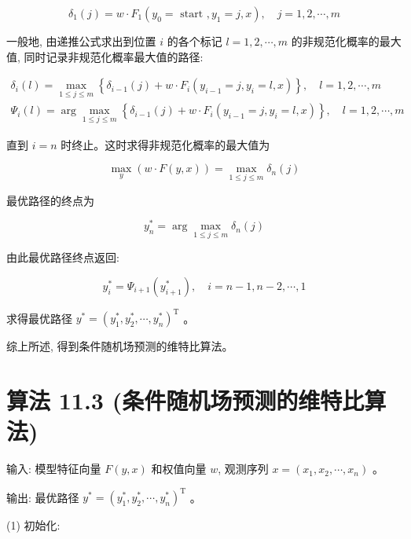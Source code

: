 \documentclass[10pt]{article}
\begin{document}
\begin{CJK*}{UTF8}{bsmi}
\begin{equation*}
\delta_{1}(j)=w \cdot F_{1}\left(y_{0}=\text { start }, y_{1}=j, x\right), \quad j=1,2, \cdots, m \tag{11.54}
\end{equation*}


一般地, 由递推公式求出到位置 $i$ 的各个标记 $l=1,2, \cdots, m$ 的非规范化概率的最大值, 同时记录非规范化概率最大值的路径:


\begin{gather*}
\delta_{i}(l)=\max _{1 \leqslant j \leqslant m}\left\{\delta_{i-1}(j)+w \cdot F_{i}\left(y_{i-1}=j, y_{i}=l, x\right)\right\}, \quad l=1,2, \cdots, m  \tag{11.55}\\
\Psi_{i}(l)=\arg \max _{1 \leqslant j \leqslant m}\left\{\delta_{i-1}(j)+w \cdot F_{i}\left(y_{i-1}=j, y_{i}=l, x\right)\right\}, \quad l=1,2, \cdots, m \tag{11.56}
\end{gather*}


直到 $i=n$ 时终止。这时求得非规范化概率的最大值为


\begin{equation*}
\max _{y}(w \cdot F(y, x))=\max _{1 \leqslant j \leqslant m} \delta_{n}(j) \tag{11.57}
\end{equation*}


最优路径的终点为


\begin{equation*}
y_{n}^{*}=\arg \max _{1 \leqslant j \leqslant m} \delta_{n}(j) \tag{11.58}
\end{equation*}


由此最优路径终点返回:


\begin{equation*}
y_{i}^{*}=\Psi_{i+1}\left(y_{i+1}^{*}\right), \quad i=n-1, n-2, \cdots, 1 \tag{11.59}
\end{equation*}


求得最优路径 $y^{*}=\left(y_{1}^{*}, y_{2}^{*}, \cdots, y_{n}^{*}\right)^{\mathrm{T}}$ 。

综上所述, 得到条件随机场预测的维特比算法。

\section*{算法 11.3 (条件随机场预测的维特比算法)}
输入: 模型特征向量 $F(y, x)$ 和权值向量 $w$, 观测序列 $x=\left(x_{1}, x_{2}, \cdots, x_{n}\right)$ 。

输出: 最优路径 $y^{*}=\left(y_{1}^{*}, y_{2}^{*}, \cdots, y_{n}^{*}\right)^{\mathrm{T}}$ 。

(1) 初始化:


\end{CJK*}
\end{document}
